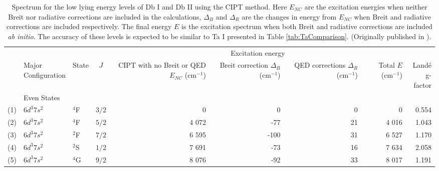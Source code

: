 \documentclass[10pt,a4paper, twoside]{report}
\begin{document}
\begin{table}[p!]
\begin{adjustwidth}{-1.3cm}{-1.3cm}
\centering 
\caption[Low lying energy spectrum of Db I and Db II calculated using the CIPT method]{Spectrum for the low lying energy levels of Db I and Db II using the CIPT method. Here $E_{NC}$ are the excitation energies when neither Breit nor radiative corrections are included in the calculations, $\Delta_B$ and $\Delta_R$ are the changes in energy from $E_{NC}$ when Breit and radiative corrections are included respectively. The final energy $E$ is the excitation spectrum when both Breit and radiative corrections are included \textit{ab initio}. The accuracy of these levels is expected to be similar to Ta I presented in Table \ref{tab:TaComparison}. (Originally published in \cite{LDFDb2018}). \label{table:DbISpectrum}} 
\begin{tabular}{cllcrrrrr}
\toprule
\toprule
  & & & & \multicolumn{4}{c}{Excitation energy} &\\
  \cmidrule{5-8}
& \parbox{2cm}{Major \\ Configuration} & State & $J$ & \parbox{2cm}{CIPT with \\ no Breit or QED \\ $E_{NC}$ \\ (cm$^{-1}$)} & \parbox{2cm}{Breit \\ correction \\ $\Delta_B$ \\ (cm$^{-1}$)} & \parbox{2cm}{QED \\ corrections \\$\Delta_R$\\ (cm$^{-1}$)} &  \parbox{2cm}{Total\\ $E$ \\ (cm$^{-1}$)} & \parbox{1.5cm}{Land\'{e} \\g-factor} \\ 
\midrule
& Even States \\
(1)  &   $6d^3 7s^2$  &  $^4$F  &  $3/2$ & 0 & 0 & 0 & 0 & 0.554 \\ 
(2) &   $6d^3 7s^2$  &  $^4$F &  $5/2$  &  4 072 & -77 & 21 & 4 016 & 1.043 \\ 
(3)  &  $6d^3 7s^2$  &  $^2$F &  $7/2$  &  6 595 & -100 & 31 & 6 527 & 1.170 \\ 
(4)  &  $6d^3 7s^2$  &  $^2$S  & $1/2$ &  7 691 &  -73  &  16 & 7 634 & 2.058 \\ 
(5)  &  $6d^3 7s^2$  &  $^4$G &  $9/2$ &  8 076 & -92 &  33 & 8 017 & 1.191 \\ 

\end{tabular}
\end{adjustwidth}
\end{table}
\end{document}
